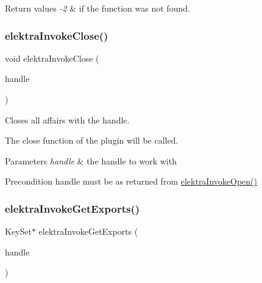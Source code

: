 \begin{DoxyRetVals}{Return values}
{\em -\/2} & if the function was not found. \\
\hline
\end{DoxyRetVals}
\mbox{\label{group__invoke_ga511b84e5cea7dbd2b23c4da5c8ff5ae3}} 
\subsubsection{\texorpdfstring{elektra\+Invoke\+Close()}{elektraInvokeClose()}}
{\footnotesize\ttfamily void elektra\+Invoke\+Close (\begin{DoxyParamCaption}\item[{Elektra\+Invoke\+Handle $\ast$}]{handle }\end{DoxyParamCaption})}



Closes all affairs with the handle. 

The close function of the plugin will be called.


\begin{DoxyParams}{Parameters}
{\em handle} & the handle to work with\\
\hline
\end{DoxyParams}
\begin{DoxyPrecond}{Precondition}
handle must be as returned from \hyperlink{group__invoke_ga3fd9791ecf43c0dde08a2fc1f02db6bc}{elektra\+Invoke\+Open()} 
\end{DoxyPrecond}
\mbox{\label{group__invoke_ga6ab386aba337d8d3fd7978070d613efe}} 
\subsubsection{\texorpdfstring{elektra\+Invoke\+Get\+Exports()}{elektraInvokeGetExports()}}
{\footnotesize\ttfamily Key\+Set$\ast$ elektra\+Invoke\+Get\+Exports (\begin{DoxyParamCaption}\item[{Elektra\+Invoke\+Handle $\ast$}]{handle }\end{DoxyParamCaption})}



